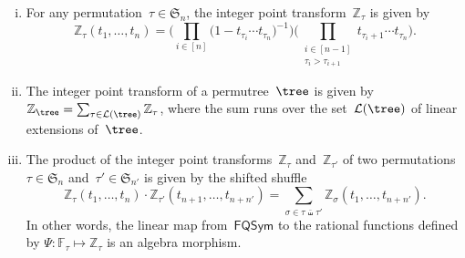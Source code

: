 \documentclass[ALCO]{cedram}
\newcommand{\fS}{\mathfrak{S}} %
\newcommand{\linearExtensions}{\mathcal{L}} %
\newcommand{\FQSym}{\mathsf{FQSym}} %
\newcommand{\integerPointTransform}{\mathbb{Z}} %
\newcommand{\product}{\cdot} %
\newcommand{\shiftedShuffle}{\,\bar\shuffle\,} %
\newcommand{\F}{\mathbb{F}} %
\begin{document}
\begin{proposition}\label{prop:integerPointTransform}

\begin{enumerate}[(i)]
\item For any permutation~$\tau \in \fS_n$, the integer point transform~$\integerPointTransform_\tau$ is given by
\[
\integerPointTransform_\tau(t_1, \dots, t_n) = \bigg( \prod\limits_{i \in [n]} \big( 1 - t_{\tau_i} \cdots t_{\tau_n} \big)^{-1} \bigg) \bigg( \prod_{\substack{i \in [n-1] \\ \tau_i > \tau_{i+1}}} t_{\tau_i+1} \cdots t_{\tau_n} \bigg).
\]
\label{item:integerPointTransformPermutation}

\item The integer point transform of a permutree~$\tree$ is given by~$\integerPointTransform_{\tree} = \sum_{\tau \in \linearExtensions(\tree)} \integerPointTransform_\tau$, where the sum runs over the set~$\linearExtensions(\tree)$ of linear extensions of~$\tree$.
\label{item:integerPointTransformLinearExtensions}

\item The product of the integer point transforms~$\integerPointTransform_\tau$ and~$\integerPointTransform_{\tau'}$ of two permutations~${\tau \in \fS_n}$ and~${\tau' \in \fS_{n'}}$ is given by the shifted shuffle
\[
\integerPointTransform_\tau(t_1, \dots, t_n) \product \integerPointTransform_{\tau'}(t_{n+1}, \dots, t_{n+n'}) = \sum_{\sigma \in \tau \shiftedShuffle \tau'} \integerPointTransform_\sigma(t_1, \dots, t_{n+n'}).
\]
In other words, the linear map from~$\FQSym$ to the rational functions defined by $\Psi\colon \F_\tau \mapsto \integerPointTransform_\tau$ is an algebra morphism.
\label{item:integerPointTransformProduct}
\end{enumerate}
\end{proposition}
\end{document}
